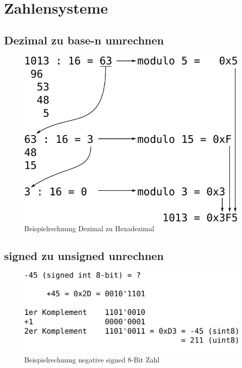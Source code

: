 \newpage
\section{Zahlensysteme}

\subsection{Dezimal zu base-n umrechnen}
\begin{figure}[h!]
	\centering
	\includegraphics[scale=0.5]{../fig/dechex.pdf}
	\caption{Beispielrechnung Dezimal zu Hexadezimal}
\end{figure}

\subsection{signed zu unsigned unrechnen}
\begin{figure}[h!]
	\centering
	\includegraphics[scale=0.5]{../fig/signed.pdf}
	\caption{Beispielrechnung negative signed 8-Bit Zahl}
\end{figure}

